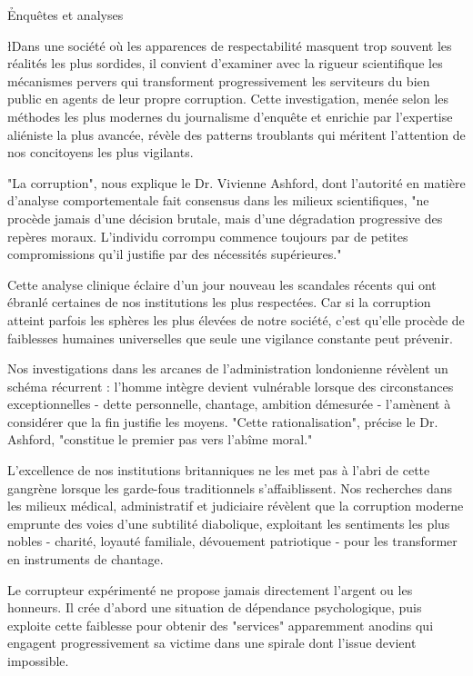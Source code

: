 \documentclass{news}
\begin{document}
\h{Enquêtes et analyses}

\l{D}ans une société où les apparences de respectabilité masquent trop souvent les réalités les plus sordides, il convient d'examiner avec la rigueur scientifique les mécanismes pervers qui transforment progressivement les serviteurs du bien public en agents de leur propre corruption. Cette investigation, menée selon les méthodes les plus modernes du journalisme d'enquête et enrichie par l'expertise aliéniste la plus avancée, révèle des patterns troublants qui méritent l'attention de nos concitoyens les plus vigilants.

"La corruption", nous explique le Dr. Vivienne Ashford, dont l'autorité en matière d'analyse comportementale fait consensus dans les milieux scientifiques, "ne procède jamais d'une décision brutale, mais d'une dégradation progressive des repères moraux. L'individu corrompu commence toujours par de petites compromissions qu'il justifie par des nécessités supérieures."

Cette analyse clinique éclaire d'un jour nouveau les scandales récents qui ont ébranlé certaines de nos institutions les plus respectées. Car si la corruption atteint parfois les sphères les plus élevées de notre société, c'est qu'elle procède de faiblesses humaines universelles que seule une vigilance constante peut prévenir.

Nos investigations dans les arcanes de l'administration londonienne révèlent un schéma récurrent : l'homme intègre devient vulnérable lorsque des circonstances exceptionnelles - dette personnelle, chantage, ambition démesurée - l'amènent à considérer que la fin justifie les moyens. "Cette rationalisation", précise le Dr. Ashford, "constitue le premier pas vers l'abîme moral."

L'excellence de nos institutions britanniques ne les met pas à l'abri de cette gangrène lorsque les garde-fous traditionnels s'affaiblissent. Nos recherches dans les milieux médical, administratif et judiciaire révèlent que la corruption moderne emprunte des voies d'une subtilité diabolique, exploitant les sentiments les plus nobles - charité, loyauté familiale, dévouement patriotique - pour les transformer en instruments de chantage.

Le corrupteur expérimenté ne propose jamais directement l'argent ou les honneurs. Il crée d'abord une situation de dépendance psychologique, puis exploite cette faiblesse pour obtenir des "services" apparemment anodins qui engagent progressivement sa victime dans une spirale dont l'issue devient impossible.
\end{document}
